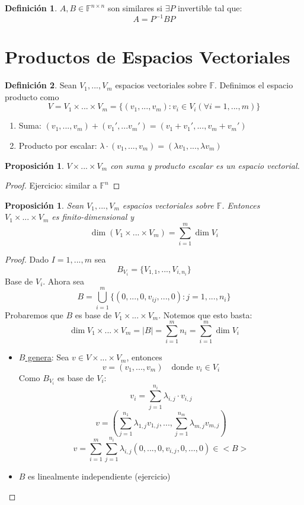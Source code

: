 \documentclass[11pt]{book}
\newtheorem{prop}[thm]{Proposición}
\theoremstyle{definition}
\newtheorem{defn}{Definición}[section]
\begin{document}
\begin{defn}
$A,B\in\mathbb{F}^{n\times n}$ son similares si $\exists P$ invertible tal que:
\[A=P^{-1}BP\]
\end{defn}
\section{Productos de Espacios Vectoriales}
\begin{defn}
Sean $V_1,...,V_m$ espacios vectoriales sobre $\mathbb{F}$. Definimos el espacio producto como
\[V=V_1\times...\times V_m=\{(v_1,...,v_m):v_i\in V_i(\forall i=1,...,m)\}\]
\begin{enumerate}
	\item Suma: $(v_1,...,v_m)+(v_1',...v_m')=(v_1+v_1',...,v_m+v_m')$
	
	\item Producto por escalar: $\lambda\cdot (v_1,...,v_m)=(\lambda v_1,...,\lambda v_m)$
\end{enumerate}
\end{defn}
\begin{prop}
$V\times...\times V_m$ con suma y producto escalar es un espacio vectorial.
\end{prop}
\begin{proof}
Ejercicio: similar a $\mathbb{F}^n$
\end{proof}
\begin{prop}
Sean $V_1,...,V_m$ espacios vectoriales sobre $\mathbb{F}$. Entonces $V_1\times...\times V_m$ es finito-dimensional y 
\[\dim(V_1\times...\times V_m)=\sum^m_{i=1}\dim V_i\]
\end{prop}
\begin{proof}
Dado $I=1,...,m$ sea
\[B_{V_i}=\{V_{1,1},...,V_{i,n_i}\}\]
Base de $V_i$. Ahora sea
\[B=\bigcup^m_{i=1}\{(0,...,0,v_{ij},...,0):j=1,...,n_i\}\]
Probaremos que $B$ es base de $V_1\times...\times V_m$. Notemos que esto basta:
\[\dim V_1\times...\times V_m=|B|=\sum^m_{i=1}n_i=\sum^m_{i=1}\dim V_i\]
\begin{itemize}
	\item \underline{$B$ genera}: Sea $v\in V\times...\times V_m$, entonces
	\[v=(v_1,...,v_m)\quad\textrm{donde }v_i\in V_i\]
	Como $B_{V_i}$ es base de $V_i$:
	\[v_i=\sum^{n_i}_{j=1}\lambda_{i,j}\cdot v_{i,j}\]
	\[v=\left(\sum^{n_1}_{j=1}\lambda_{1,j}v_{1,j},...,\sum^{n_m}_{j=1}\lambda_{m,j}v_{m,j}\right)\]
	\[v=\sum^m_{i=1}\sum^{n_i}_{j=1}\lambda_{i,j}(0,...,0,v_{i,j},0,...,0)\in <B>\]
	
	\item $B$ es linealmente independiente (ejercicio)
\end{itemize}
\end{proof}
\end{document}
